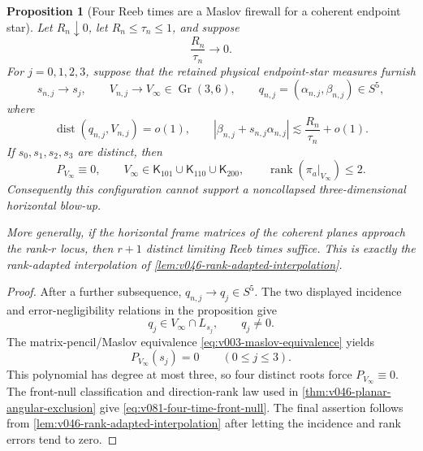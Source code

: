 \documentclass[10pt]{article}
\newtheorem{proposition}[theorem]{Proposition}
\newcommand{\rank}{\operatorname{rank}}
\newcommand{\dist}{\operatorname{dist}}
\newcommand{\Gr}{\operatorname{Gr}}
\begin{document}
\begin{proposition}[Four Reeb times are a Maslov firewall for a coherent endpoint star]
\label{prop:v081-four-time-polarization-firewall}
Let \(R_n\downarrow0\), let \(R_n\le\tau_n\le1\), and suppose
\begin{equation}
\label{eq:v081-four-time-error-negligible}
\boxed{
\frac{R_n}{\tau_n}\longrightarrow0.
}
\end{equation}
For \(j=0,1,2,3\), suppose that the retained physical endpoint-star measures furnish
\[
s_{n,j}\to s_j,
\qquad
V_{n,j}\to V_\infty\in\Gr(3,6),
\qquad
q_{n,j}=(\alpha_{n,j},\beta_{n,j})\in S^5,
\]
where
\begin{equation}
\label{eq:v081-four-time-flag-incidence}
\boxed{
\dist(q_{n,j},V_{n,j})=o(1),
\qquad
|\beta_{n,j}+s_{n,j}\alpha_{n,j}|
\lesssim
\frac{R_n}{\tau_n}+o(1).
}
\end{equation}
If \(s_0,s_1,s_2,s_3\) are distinct, then
\begin{equation}
\label{eq:v081-four-time-front-null}
\boxed{
P_{V_\infty}\equiv0,
\qquad
V_\infty\in
\mathsf K_{101}\cup\mathsf K_{110}\cup\mathsf K_{200},
\qquad
\rank(\pi_a|_{V_\infty})\le2.
}
\end{equation}
Consequently this configuration cannot support a noncollapsed three-dimensional horizontal
blow-up.

More generally, if the horizontal frame matrices of the coherent planes approach the rank-\(r\)
locus, then \(r+1\) distinct limiting Reeb times suffice.  This is exactly the rank-adapted
interpolation of \cref{lem:v046-rank-adapted-interpolation}.
\end{proposition}

\begin{proof}
After a further subsequence, \(q_{n,j}\to q_j\in S^5\).  The two displayed incidence and
error-negligibility relations in the proposition give
\[
q_j\in V_\infty\cap L_{s_j},
\qquad
q_j\ne0.
\]
The matrix-pencil/Maslov equivalence
\eqref{eq:v003-maslov-equivalence} yields
\[
P_{V_\infty}(s_j)=0
\qquad(0\le j\le3).
\]
This polynomial has degree at most three, so four distinct roots force
\(P_{V_\infty}\equiv0\).  The front-null classification and direction-rank law used in
\cref{thm:v046-planar-angular-exclusion} give
\eqref{eq:v081-four-time-front-null}.  The final assertion follows from
\cref{lem:v046-rank-adapted-interpolation} after letting the incidence and rank errors tend to zero.
\end{proof}
\end{document}
